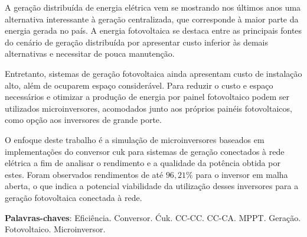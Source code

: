 \documentclass[
	12pt,				%
	openright,			%
	twoside,			%
	a4paper,			%
	english,			%
	french,				%
	spanish,			%
	brazil,				%
	]{abntex2}
\begin{document}


	\setlength{\absparsep}{18pt} %
	\begin{resumo}
	
		A geração distribuída de energia elétrica vem se mostrando nos últimos anos uma alternativa interessante à geração centralizada, que corresponde à maior parte da energia gerada no país. A energia fotovoltaica se destaca entre as principais fontes do cenário de geração distribuída por apresentar custo inferior às demais alternativas e necessitar de pouca manutenção.

		Entretanto, sistemas de geração fotovoltaica ainda apresentam custo de instalação alto, além de ocuparem espaço considerável. Para reduzir o custo e espaço necessários e otimizar a produção de energia por painel fotovoltaico podem ser utilizados microinversores, acomodados junto aos próprios painéis fotovoltaicos, como opção aos inversores de grande porte. 

		O enfoque deste trabalho é a simulação de microinversores baseados em implementações do conversor cuk para sistemas de geração conectados à rede elétrica a fim de analisar o rendimento e a qualidade da potência obtida por estes. Foram observados rendimentos de até $96,21\%$  para o inversor em malha aberta, o que indica a potencial viabilidade da utilização desses inversores para a geração fotovoltaica conectada à rede.

	\vspace{\onelineskip}
	\noindent
	\textbf{Palavras-chaves}: Eficiência. Conversor. Ćuk. CC-CC. CC-CA. MPPT. Geração. Fotovoltaico. Microinversor.
	\end{resumo}
\end{document}
